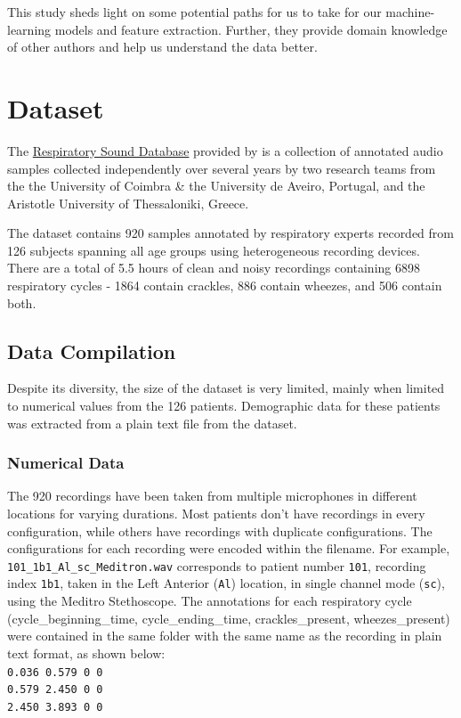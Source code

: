\documentclass[10pt,twocolumn,letterpaper]{article}
\begin{document}
This study sheds light on some potential paths for us to take for our machine-learning models and feature
extraction. Further, they provide domain knowledge of other authors and help us understand the data better.

\section{Dataset}
The \href{https://ai4eu.dei.uc.pt/respiratory-sounds-dataset/}{Respiratory Sound Database} provided by \cite{rocha}
is a collection of annotated audio samples collected independently over several years by two research teams from the
the University of Coimbra \& the University de Aveiro, Portugal, and the Aristotle University of Thessaloniki, Greece.

The dataset contains 920 samples annotated by respiratory experts recorded from 126 subjects spanning all age
groups using heterogeneous recording devices. There are a total of 5.5 hours of clean and noisy recordings
containing 6898 respiratory cycles - 1864 contain crackles, 886 contain wheezes, and 506 contain both.

\subsection*{Data Compilation}
Despite its diversity, the size of the dataset is very limited, mainly when limited to numerical values from the 126 patients. Demographic data for these patients was extracted from a plain text file from the dataset.

\subsubsection*{Numerical Data}
The 920 recordings have been taken from multiple microphones in different locations for varying durations. Most patients don't have recordings in every configuration, while others have recordings with duplicate configurations. The configurations for each recording were encoded within the filename. For example, \texttt{101\_1b1\_Al\_sc\_Meditron.wav} corresponds to patient number \texttt{101}, recording index \texttt{1b1}, taken in the Left Anterior (\texttt{Al}) location, in single channel mode (\texttt{sc}), using the Meditro Stethoscope. The annotations for each respiratory cycle (cycle\_beginning\_time, cycle\_ending\_time, crackles\_present, wheezes\_present) were contained in the same folder with the same name as the recording in plain text format, as shown below:
\vspace*{0pt} \\
\hspace*{75pt} \texttt{0.036    0.579	0	0} \\
\hspace*{75pt} \texttt{0.579	2.450	0	0} \\
\hspace*{75pt} \texttt{2.450	3.893	0	0}
\end{document}
